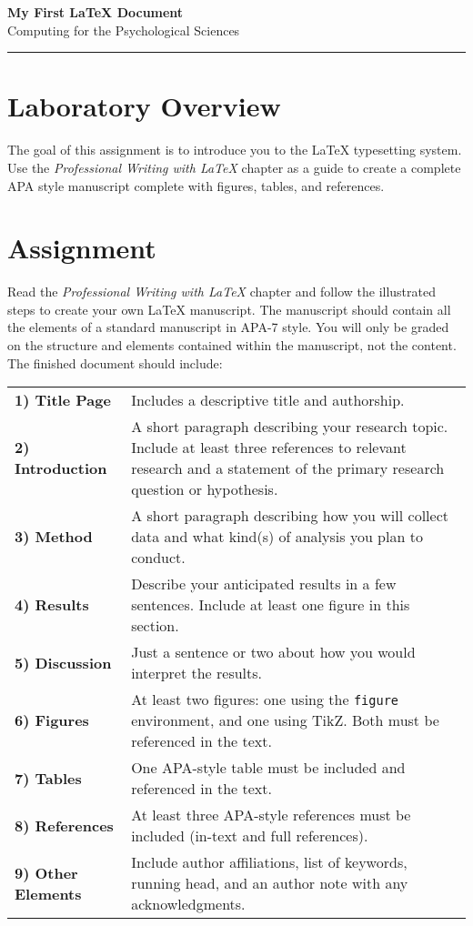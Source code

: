\documentclass[11pt]{article}
\begin{document}
\begin{center}
    \LARGE \textbf{My First \LaTeX{} Document}\\[1em]
    \large Computing for the Psychological Sciences\\
    \rule{\linewidth}{0.4pt}
\end{center}

\section*{Laboratory Overview}
The goal of this assignment is to introduce you to the \LaTeX{} typesetting system. Use the \textit{Professional Writing with \LaTeX{}} chapter as a guide to create a complete APA style manuscript complete with figures, tables, and references.

\section*{Assignment}
Read the \textit{Professional Writing with \LaTeX{}} chapter and follow the illustrated steps to create your own \LaTeX{} manuscript. The manuscript should contain all the elements of a standard manuscript in APA-7 style. You will only be graded on the structure and elements contained within the manuscript, not the content. The finished document should include:

\vspace{0.5em}
\begin{tabular}{>{\bfseries}p{1.5cm}p{12cm}}
1) Title Page & Includes a descriptive title and authorship. \\
2) Introduction & A short paragraph describing your research topic. Include at least three references to relevant research and a statement of the primary research question or hypothesis. \\
3) Method & A short paragraph describing how you will collect data and what kind(s) of analysis you plan to conduct. \\
4) Results & Describe your anticipated results in a few sentences. Include at least one figure in this section. \\
5) Discussion & Just a sentence or two about how you would interpret the results. \\
6) Figures & At least two figures: one using the \texttt{figure} environment, and one using TikZ. Both must be referenced in the text. \\
7) Tables & One APA-style table must be included and referenced in the text. \\
8) References & At least three APA-style references must be included (in-text and full references). \\
9) Other Elements & Include author affiliations, list of keywords, running head, and an author note with any acknowledgments. \\
\end{tabular}
\end{document}
